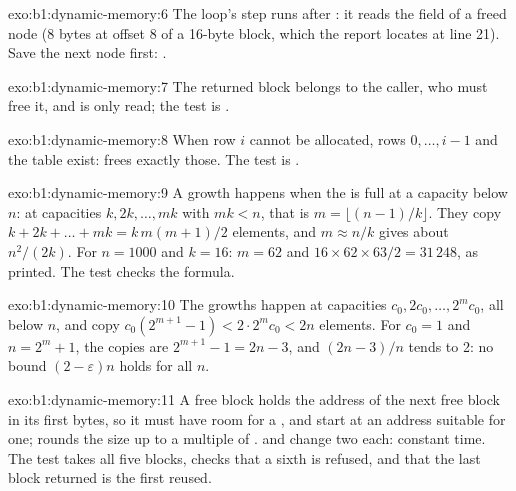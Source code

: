 \begin{solution}{exo:b1:dynamic-memory:6}
The loop's step  runs after : it reads the field  of a freed node (8 bytes at
offset 8 of a 16-byte block, which the report locates at line 21). Save the next node first:
.
\end{solution}

\begin{solution}{exo:b1:dynamic-memory:7}
The returned block belongs to the caller, who must free it, and  is only read; the test
is .
\end{solution}

\begin{solution}{exo:b1:dynamic-memory:8}
When row $i$ cannot be allocated, rows $0, \dots, i-1$ and the table exist:  frees exactly
those. The test is .
\end{solution}

\begin{solution}{exo:b1:dynamic-memory:9}
A growth happens when the  is full at a capacity below $n$: at capacities $k, 2k, \dots, mk$ with $mk < n$, that
is $m = \lfloor (n-1)/k \rfloor$. They copy $k + 2k + \dots + mk = k\,m(m+1)/2$ elements, and $m \approx n/k$ gives
about $n^2/(2k)$. For $n = 1000$ and $k = 16$: $m = 62$ and $16 \times 62 \times 63/2 = 31\,248$, as printed. The test
 checks the formula.
\end{solution}

\begin{solution}{exo:b1:dynamic-memory:10}
The growths happen at capacities $c_0, 2c_0, \dots, 2^m c_0$, all below $n$, and copy
$c_0(2^{m+1} - 1) < 2 \cdot 2^m c_0 < 2n$ elements. For $c_0 = 1$ and $n = 2^m + 1$, the copies are
$2^{m+1} - 1 = 2n - 3$, and $(2n - 3)/n$ tends to 2: no bound $(2 - \varepsilon)n$ holds for all $n$.
\end{solution}

\begin{solution}{exo:b1:dynamic-memory:11}
A free block holds the address of the next free block in its first bytes, so it must have room for a , and
start at an address suitable for one;  rounds the size up to a multiple of .
 and  change two  each: constant time. The test  takes
all five blocks, checks that a sixth is refused, and that the last block returned is the first reused.
\end{solution}

